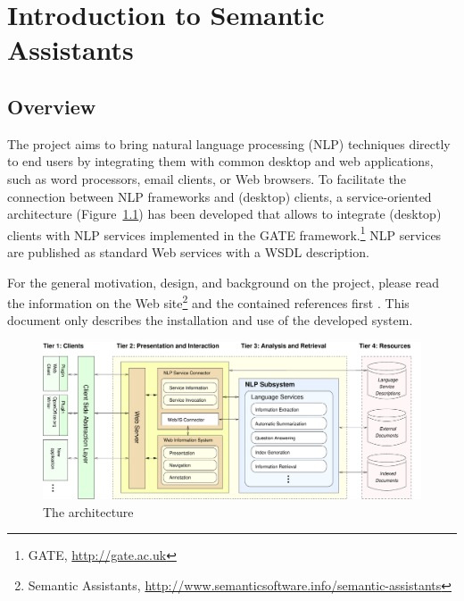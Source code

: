 
\chapter{Introduction to Semantic Assistants}

\section{Overview}
The \sa project aims to bring natural language processing (NLP)
techniques directly to end users by integrating them with common
desktop and web applications, such as word processors, email clients, or Web
browsers. To facilitate the connection between NLP frameworks and
(desktop) clients, a service-oriented architecture
(Figure~\ref{fig:arch}) has been developed that allows to integrate
(desktop) clients with NLP services implemented in the GATE
framework.\footnote{GATE, \url{http://gate.ac.uk}} NLP services are
published as standard Web services with a WSDL description.

For the general motivation, design, and background on the \sa project,
please read the information on the \sa Web site\footnote{Semantic
  Assistants,
  \url{http://www.semanticsoftware.info/semantic-assistants}} and the
contained references first \citep{giwi08,aswc08}. This document only
describes the installation and use of the developed system.

\begin{figure}[t]
  \centering
  \includegraphics[width=\textwidth]{pictures/arch}
  \caption{The \sa architecture}
  \label{fig:arch}
\end{figure}

